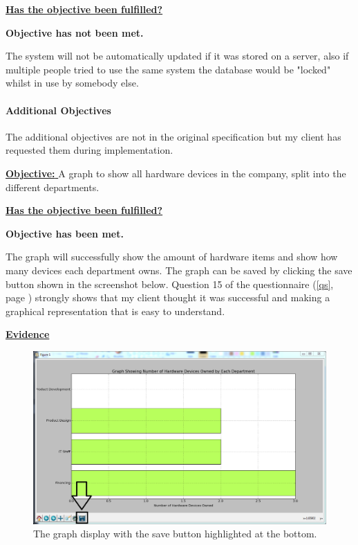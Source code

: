 \underline{\textbf{Has the objective been fulfilled?}}

\textbf{Objective has not been met.}

The system will not be automatically updated if it was stored on a server, also if multiple people tried to use the same system the database would be "locked" whilst in use by somebody else. 


\paragraph{Additional Objectives}

The additional objectives are not in the original specification but my client has requested them during implementation.

\underline{\textbf{Objective:} } A graph to show all hardware devices in the company, split into the different departments.

\underline{\textbf{Has the objective been fulfilled?}}

\textbf{Objective has been met.} 

The graph will successfully show the amount of hardware items and show how many devices each department owns. The graph can be saved by clicking the save button shown in the screenshot below. Question 15 of the questionnaire (\ref{qs}, page \pageref{qs}) strongly shows that my client thought it was successful and making a graphical representation that is easy to understand.

\underline{\textbf{Evidence}}

\begin{figure}[H]
    \includegraphics[width=\textwidth]{./Manual/Images/graph2.png}
    \caption{The graph display with the save button highlighted at the bottom.} 
\end{figure}

